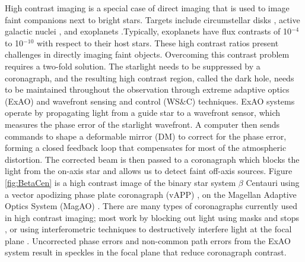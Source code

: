 High contrast imaging is a special case of direct imaging that is used to image faint companions next to bright stars. Targets include circumstellar disks \citep{rodigas2014morphology}, active galactic nuclei \citep{imanishi2020subaru}, and exoplanets \citep{bowler2016imaging}.Typically, exoplanets have flux contrasts of 10$^{-4}$ to 10$^{-10}$ with respect to their host stars. These high contrast ratios present challenges in directly imaging faint objects. Overcoming this contrast problem requires a two-fold solution. The starlight needs to be suppressed by a coronagraph, and the resulting high contrast region, called the dark hole, needs to be maintained throughout the observation through extreme adaptive optics (ExAO) and wavefront sensing and control (WS$\&$C) techniques. ExAO systems operate by propagating light from a guide star to a wavefront sensor, which measures the phase error of the starlight wavefront. A computer then sends commands to shape a deformable mirror (DM) to correct for the phase error, forming a closed feedback loop that compensates for most of the atmospheric distortion. The corrected beam is then passed to a coronagraph which blocks the light from the on-axis star and allows us to detect faint off-axis sources. Figure \ref{fig:BetaCen} is a high contrast image of the binary star system $\beta$ Centauri using a vector apodizing phase plate coronagraph (vAPP) \citep{snik2012vector}, on the Magellan Adaptive Optics System (MagAO) \citep{close2018status}. There are many types of coronagraphs currently used in high contrast imaging; most work by blocking out light using masks and stops \citep{soummer2004apodized}, or using interferometric techniques to destructively interfere light at the focal plane \citep{foo2005optical}. Uncorrected phase errors and non-common path errors from the ExAO system result in speckles in the focal plane that reduce coronagraph contrast.
 

